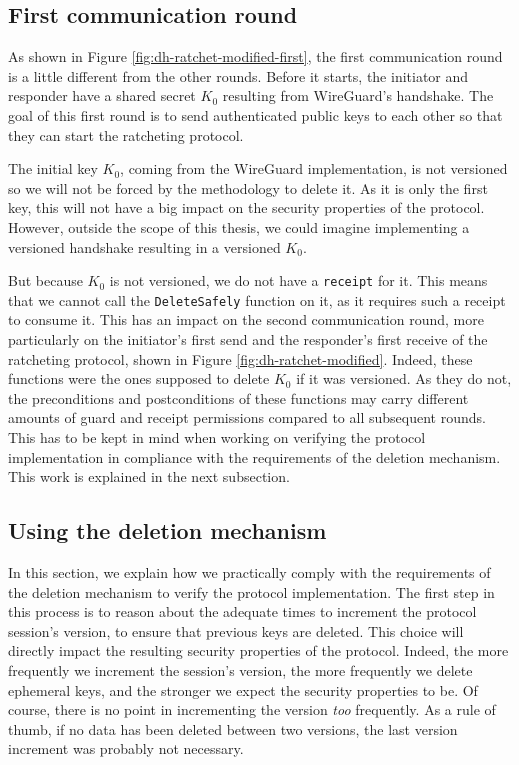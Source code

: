 \subsection{First communication round}
\label{sec:first-communication-round}

As shown in Figure \ref{fig:dh-ratchet-modified-first}, the first communication round is a little different from the other rounds.
Before it starts, the initiator and responder have a shared secret $K_0$ resulting from WireGuard's handshake.
The goal of this first round is to send authenticated public keys to each other so that they can start the ratcheting protocol.

The initial key $K_0$, coming from the WireGuard implementation, is not versioned so we will not be forced by the methodology to delete it. As it is only the first key, this will not have a big impact on the security properties of the protocol. However, outside the scope of this thesis, we could imagine implementing a versioned handshake resulting in a versioned $K_0$.

But because $K_0$ is not versioned, we do not have a \texttt{receipt} for it.
This means that we cannot call the \texttt{DeleteSafely} function on it, as it requires such a receipt to consume it.
This has an impact on the second communication round, more particularly on the initiator's first send and the responder's first receive of the ratcheting protocol, shown in Figure \ref{fig:dh-ratchet-modified}.
Indeed, these functions were the ones supposed to delete $K_0$ if it was versioned.
As they do not, the preconditions and postconditions of these functions may carry different amounts of guard and receipt permissions compared to all subsequent rounds.
This has to be kept in mind when working on verifying the protocol implementation in compliance with the requirements of the deletion mechanism.
This work is explained in the next subsection.

\subsection{Using the deletion mechanism}

In this section, we explain how we practically comply with the requirements of the deletion mechanism to verify the protocol implementation.
The first step in this process is to reason about the adequate times to increment the protocol session's version, to ensure that previous keys are deleted.
This choice will directly impact the resulting security properties of the protocol.
Indeed, the more frequently we increment the session's version, the more frequently we delete ephemeral keys, and the stronger we expect the security properties to be.
Of course, there is no point in incrementing the version \emph{too} frequently. As a rule of thumb, if no data has been deleted between two versions, the last version increment was probably not necessary.

